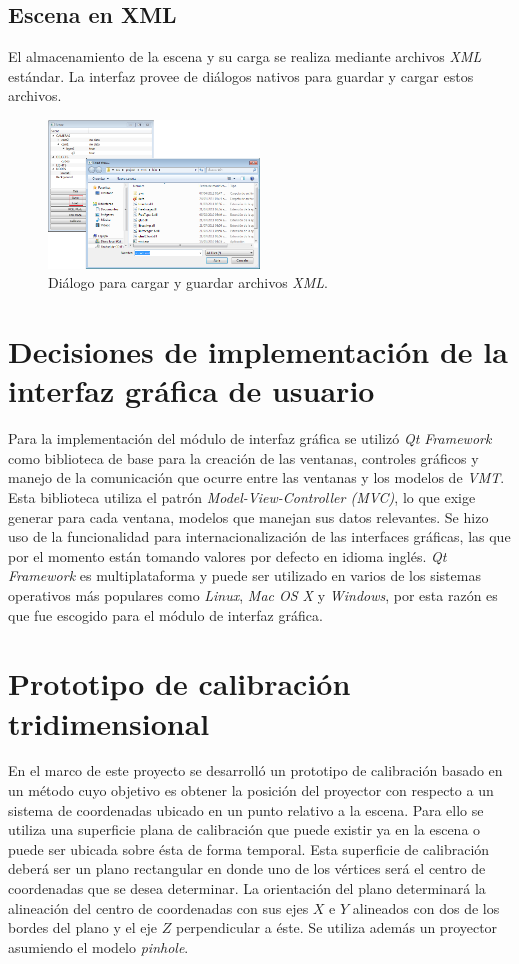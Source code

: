 \subsection{Escena en XML}
El almacenamiento de la escena y su carga se realiza mediante archivos \emph{XML} estándar. La interfaz provee de diálogos nativos para guardar y cargar estos archivos.

\begin{figure}[H]
  \centering
    \includegraphics[width=0.5\textwidth]{./Cap5_vmt/vmt_loadShow.png}
  \caption{Diálogo para cargar y guardar archivos \emph{XML}.}
  \label{fig:VMT-XML}
\end{figure}

\section{Decisiones de implementación de la interfaz gráfica de usuario}
Para la implementación del módulo de interfaz gráfica se utilizó \emph{Qt Framework} \cite{Qt-framework} como biblioteca de base para la creación de las ventanas, controles gráficos y manejo de la comunicación que ocurre entre las ventanas y los modelos de \emph{VMT}. Esta biblioteca utiliza el patrón \emph{Model-View-Controller (MVC)}, lo que exige generar para cada ventana, modelos que manejan sus datos relevantes.
Se hizo uso de la funcionalidad para internacionalización de las interfaces gráficas, las que por el momento están tomando valores por defecto en idioma inglés. \emph{Qt Framework} es multiplataforma y puede ser utilizado en varios de los sistemas operativos más populares como \emph{Linux}, \emph{Mac OS X} y \emph{Windows}, por esta razón es que fue escogido para el módulo de interfaz gráfica.

\section{Prototipo de calibración tridimensional}
En el marco de este proyecto se desarrolló un prototipo de calibración basado en un método cuyo objetivo es obtener la posición del proyector con respecto a un sistema de coordenadas ubicado en un punto relativo a la escena. Para ello se utiliza una superficie plana de calibración que puede existir ya en la escena o puede ser ubicada sobre ésta de forma temporal. Esta superficie de calibración deberá ser un plano rectangular en donde uno de los vértices será el centro de coordenadas que se desea determinar. La orientación del plano determinará la alineación del centro de coordenadas con sus ejes $X$ e $Y$ alineados con dos de los bordes del plano y el eje $Z$ perpendicular a éste. Se utiliza además un proyector asumiendo el modelo \emph{pinhole}.

